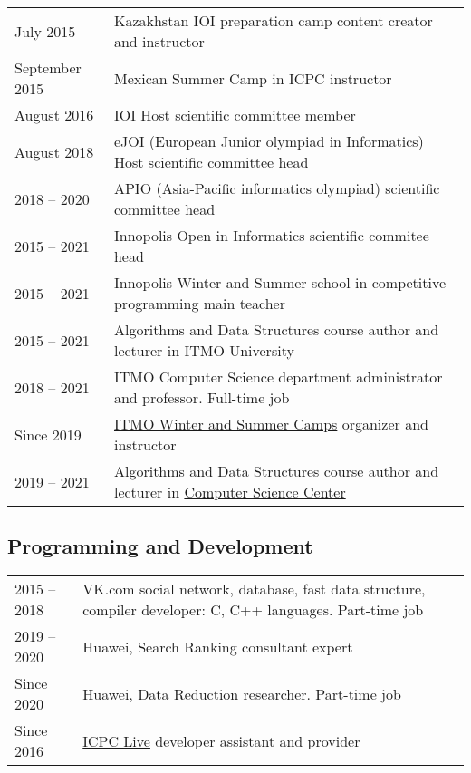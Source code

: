 \documentclass[11pt,a4paper,oneside]{article}
\begin{document}
\begin{center}
  \begin{tabular}{l|p{12 cm}}
    July 2015 & Kazakhstan IOI preparation camp content creator and instructor \\
    September 2015 & Mexican Summer Camp in ICPC instructor \\
    August 2016 & IOI Host scientific committee member \\
    August 2018 & eJOI (European Junior olympiad in Informatics) Host scientific committee head \\
    2018 -- 2020 & APIO (Asia-Pacific informatics olympiad) scientific committee head \\
    2015 -- 2021 & Innopolis Open in Informatics scientific commitee head \\
    2015 -- 2021 & Innopolis Winter and Summer school in competitive programming main teacher \\
    2015 -- 2021 & Algorithms and Data Structures course author and lecturer in ITMO University \\
    2018 -- 2021 & ITMO Computer Science department administrator and professor. Full-time job \\
    Since 2019 & \href{https://schools.itmo.ru/en/school/32/}{ITMO Winter and Summer Camps} organizer and instructor \\
    2019 -- 2021 & Algorithms and Data Structures course author and lecturer in \href{https://compscicenter.ru/}{Computer Science Center} \\
  \end{tabular}
\end{center}

\subsection{Programming and Development}
  \begin{tabular}{l|p{12 cm}}
    2015 -- 2018 & VK.com social network, database, fast data structure, compiler developer: C, C++ languages. Part-time job \\
    2019 -- 2020 & Huawei, Search Ranking consultant expert \\
    Since 2020 & Huawei, Data Reduction researcher. Part-time job \\
    Since 2016 & \href{https://www.youtube.com/channel/UCDBXshZdICEHr0HSVsLrydA}{ICPC Live} developer assistant and provider \\
  \end{tabular}
\end{document}
